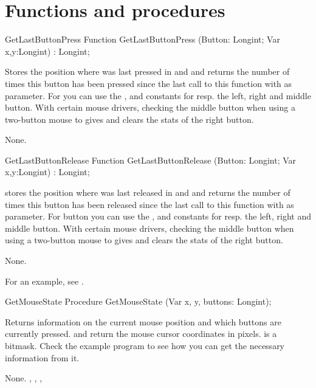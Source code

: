 \section{Functions and procedures}
\begin{function}{GetLastButtonPress}
\Declaration
Function GetLastButtonPress (Button: Longint; Var x,y:Longint) : Longint;

\Description
 
Stores the position where  was last pressed in  and
 and returns
the number of times this button has been pressed since the last call to this
function with  as parameter. For  you can use the 
,  and  constants for resp. the left, 
right and middle button.
With certain mouse drivers, checking the middle button when using a
two-button mouse to gives and clears the stats of the right button.

\Errors
None.
\SeeAlso
{}
\end{function}


\begin{function}{GetLastButtonRelease}
\Declaration
Function GetLastButtonRelease (Button: Longint; Var x,y:Longint) : Longint;

\Description

stores the position where  was last released in  and 
 and returns
the number of times this button has been released since the last call to this
function with  as parameter. For button you can use the
,  and  constants for resp. 
the left, right and middle button.
With certain mouse drivers, checking the middle button when using a
two-button mouse to gives and clears the stats of the right button.

\Errors
None.
\SeeAlso
{}
\end{function}

For an example, see .

\begin{procedure}{GetMouseState}
\Declaration
Procedure GetMouseState (Var x, y, buttons: Longint);

\Description

 Returns information on the current mouse position 
and which buttons are currently pressed.
 and  return the mouse cursor coordinates in pixels.
 is a bitmask. Check the example program to see how you can get the
necessary information from it.

\Errors
None.
\SeeAlso
{}, , ,
\end{procedure}


